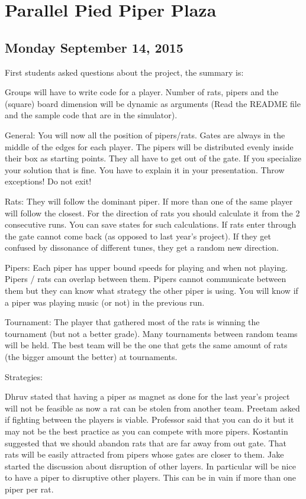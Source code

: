 \section{Parallel Pied Piper Plaza}
\subsection{Monday September 14, 2015}
First students asked questions about the project, the summary is:

Groups will have to write code for a player. Number of rats, pipers and the (square) board dimension will be dynamic as arguments (Read the README file and the sample code that are in the simulator).

General:
You will now all the position of pipers/rats.
Gates are always in the middle of the edges for each player.
The pipers will be distributed evenly inside their box as starting points.
They all have to get out of the gate.
If you specialize your solution that is fine. You have to explain it in your presentation.
Throw exceptions! Do not exit!

Rats:
They will follow the dominant piper. If more than one of the same player will follow the closest.
For the direction of rats you should calculate it from the 2 consecutive runs. You can save states
for such calculations. 
If rats enter through the gate cannot come back (as opposed to last year’s project).
If they get confused by dissonance of different tunes, they get a random new direction.

Pipers:
Each piper has upper bound speeds for playing and when not playing. Pipers / rats can overlap between them. 
Pipers cannot communicate between them but they can know what strategy the other piper is using. 
You will know if a piper was playing music (or not) in the previous run.

Tournament:
The player that gathered most of the rats is winning the tournament (but not a better grade).
Many tournaments between random teams will be held. The best team will be the one that gets the same amount of rats (the bigger amount the better) at tournaments. 


Strategies:

Dhruv stated that having a piper as magnet as done for the last year’s project will not be feasible as now a rat can be stolen from another team.
Preetam asked if fighting between the players is viable. Professor said that you can do it but it may not be the best practice as you can compete with more pipers.
Kostantin suggested that we should abandon rats that are far away from out gate. That rats will be easily attracted from pipers whose gates are closer to them. 
Jake started the discussion about disruption of other layers. In particular will be nice to have a piper to disruptive other players. This can be in vain if more than one piper per rat.

